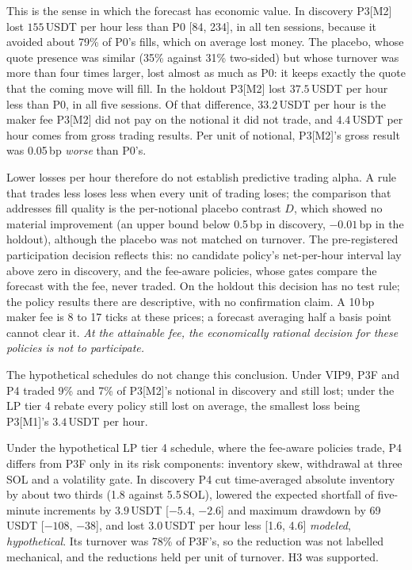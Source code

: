 \documentclass[11pt]{article}
\makeatletter
\newcommand{\status}[1]{\textit{#1}}
\newcommand{\mhr}{\status{modeled}}
\newcommand{\hyp}{\status{hypothetical}}
\newcommand{\bp}{\,bp}
\renewcommand\subsection{\@startsection{subsection}{2}{\z@}{-3ex\@plus -1ex \@minus -.2ex}{1ex \@plus .2ex}{\normalfont\normalsize\bfseries}}
\makeatother
\begin{document}
This is the sense in which the forecast has economic value. In discovery P3[M2] lost $155$\,USDT per hour less than P0
[84, 234], in all ten sessions, because it avoided about 79\% of P0's fills, which on average lost money. The placebo,
whose quote presence was similar (35\% against 31\% two-sided) but whose turnover was more than four times larger, lost
almost as much as P0: it keeps exactly the quote that the coming move will fill. In the holdout P3[M2] lost $37.5$\,USDT
per hour less than P0, in all five sessions. Of that difference, $33.2$\,USDT per hour is the maker fee P3[M2] did not pay
on the notional it did not trade, and $4.4$\,USDT per hour comes from gross trading results. Per unit of notional,
P3[M2]'s gross result was 0.05\bp{} \emph{worse} than P0's.

Lower losses per hour therefore do not establish predictive trading alpha. A rule that trades less loses less when every
unit of trading loses; the comparison that addresses fill quality is the per-notional placebo contrast $D$, which showed
no material improvement (an upper bound below 0.5\bp{} in discovery, $-0.01$\bp{} in the holdout), although the placebo
was not matched on turnover. The pre-registered participation decision reflects this: no candidate policy's
net-per-hour interval lay above zero in discovery, and the fee-aware policies, whose gates compare the forecast with the
fee, never traded. On the holdout this decision has no test rule; the policy results there are descriptive, with no
confirmation claim. A 10\bp{} maker fee is 8 to 17 ticks at these prices; a forecast averaging half a basis point cannot clear it.
\emph{At the attainable fee, the economically rational decision for these policies is not to participate.}

The hypothetical schedules do not change this conclusion. Under VIP9, P3F and P4 traded 9\% and 7\% of P3[M2]'s notional in
discovery and still lost; under the LP tier 4 rebate every policy still lost on average, the smallest loss being P3[M1]'s
$3.4$\,USDT per hour.

\subsection{Risk controls reduce risk, not losses}\label{sec:res-h3}

Under the hypothetical LP tier 4 schedule, where the fee-aware policies trade, P4 differs from P3F only in its risk
components: inventory skew, withdrawal at three SOL and a volatility gate. In discovery P4 cut time-averaged absolute
inventory by about two thirds (1.8 against 5.5\,SOL), lowered the expected shortfall of five-minute increments by $3.9$\,USDT [$-5.4$, $-2.6$]
and maximum drawdown by 69\,USDT [$-108$, $-38$], and lost $3.0$\,USDT per hour less [1.6, 4.6] \mhr, \hyp. Its turnover
was 78\% of P3F's, so the reduction was not labelled mechanical, and the reductions held per unit of turnover. H3 was
supported.
\end{document}
